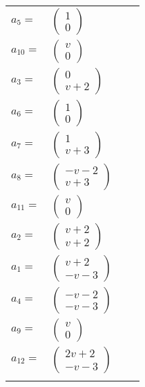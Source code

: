 \documentclass[1p]{elsarticle_modified}
\theoremstyle{definition}
\begin{document}
\begin{tabular}{m{7pt} m{180pt} m{7pt} m{180pt} }
\flushright $a_{5}=$&$\begin{pmatrix}1\\0\end{pmatrix}$ \\
\flushright $a_{10}=$&$\begin{pmatrix}v\\0\end{pmatrix}$ \\
\flushright $a_{3}=$&$\begin{pmatrix}0\\v+2\end{pmatrix}$ \\
\flushright $a_{6}=$&$\begin{pmatrix}1\\0\end{pmatrix}$ \\
\flushright $a_{7}=$&$\begin{pmatrix}1\\v+3\end{pmatrix}$ \\
\flushright $a_{8}=$&$\begin{pmatrix}- v-2\\v+3\end{pmatrix}$ \\
\flushright $a_{11}=$&$\begin{pmatrix}v\\0\end{pmatrix}$ \\
\flushright $a_{2}=$&$\begin{pmatrix}v+2\\v+2\end{pmatrix}$ \\
\flushright $a_{1}=$&$\begin{pmatrix}v+2\\- v-3\end{pmatrix}$ \\
\flushright $a_{4}=$&$\begin{pmatrix}- v-2\\- v-3\end{pmatrix}$ \\
\flushright $a_{9}=$&$\begin{pmatrix}v\\0\end{pmatrix}$ \\
\flushright $a_{12}=$&$\begin{pmatrix}2 v+2\\- v-3\end{pmatrix}$\\&\end{tabular}
\end{document}
